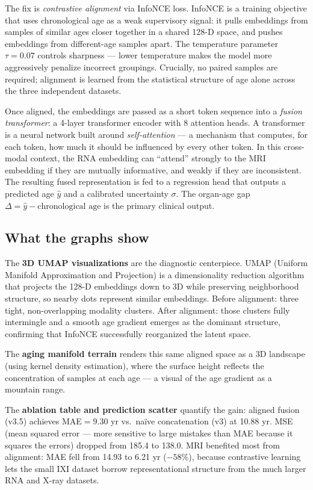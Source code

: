 \documentclass[11pt]{article}
\begin{document}
\begin{tcolorbox}[L2box]
The fix is \textit{contrastive alignment} via InfoNCE loss. InfoNCE is a training objective that uses chronological age as a weak supervisory signal: it pulls embeddings from samples of similar ages closer together in a shared 128-D space, and pushes embeddings from different-age samples apart. The temperature parameter $\tau = 0.07$ controls sharpness --- lower temperature makes the model more aggressively penalize incorrect groupings. Crucially, no paired samples are required; alignment is learned from the statistical structure of age alone across the three independent datasets.

Once aligned, the embeddings are passed as a short token sequence into a \textit{fusion transformer}: a 4-layer transformer encoder with 8 attention heads. A transformer is a neural network built around \textit{self-attention} --- a mechanism that computes, for each token, how much it should be influenced by every other token. In this cross-modal context, the RNA embedding can ``attend'' strongly to the MRI embedding if they are mutually informative, and weakly if they are inconsistent. The resulting fused representation is fed to a regression head that outputs a predicted age $\hat{y}$ and a calibrated uncertainty $\sigma$. The organ-age gap $\Delta = \hat{y} - \text{chronological age}$ is the primary clinical output.

\subsection{What the graphs show}

The \textbf{3D UMAP visualizations} are the diagnostic centerpiece. UMAP (Uniform Manifold Approximation and Projection) is a dimensionality reduction algorithm that projects the 128-D embeddings down to 3D while preserving neighborhood structure, so nearby dots represent similar embeddings. Before alignment: three tight, non-overlapping modality clusters. After alignment: those clusters fully intermingle and a smooth age gradient emerges as the dominant structure, confirming that InfoNCE successfully reorganized the latent space.

The \textbf{aging manifold terrain} renders this same aligned space as a 3D landscape (using kernel density estimation), where the surface height reflects the concentration of samples at each age --- a visual of the age gradient as a mountain range.

The \textbf{ablation table and prediction scatter} quantify the gain: aligned fusion (v3.5) achieves MAE$=9.30$ yr vs.\ naïve concatenation (v3) at 10.88 yr. MSE (mean squared error --- more sensitive to large mistakes than MAE because it squares the errors) dropped from 185.4 to 138.0. MRI benefited most from alignment: MAE fell from 14.93 to 6.21 yr ($-58\%$), because contrastive learning lets the small IXI dataset borrow representational structure from the much larger RNA and X-ray datasets.


\end{tcolorbox}
\end{document}
